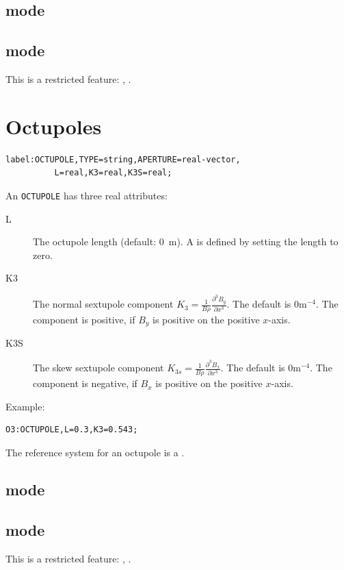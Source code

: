 \subsection{\opalt mode}

\subsection{\opalcycl mode}

This is a restricted feature: \noopalt, \noopalcycl .

\section{Octupoles}
\label{sec:octupole}
\begin{verbatim}
label:OCTUPOLE,TYPE=string,APERTURE=real-vector,
          L=real,K3=real,K3S=real;
\end{verbatim}
An \texttt{OCTUPOLE} has three real attributes:
\begin{description}
\item[L]
  The octupole length (default: 0~m).
  A  is defined by setting the length to zero.
\item[K3]
  The normal sextupole component
  $K_3=\frac{1}{B \rho}\frac{\partial^3 B_y}{\partial x^3}$.
  The default is $0 \mathrm{m}^{-4}$.
  The component is positive, if $B_y$ is positive on the positive $x$-axis.
\item[K3S]
  The skew sextupole component
  $K_{3s}=\frac{1}{B \rho}\frac{\partial^3 B_x}{\partial x^3}$.
  The default is $0 \mathrm{m}^{-4}$.
  The component is negative, if $B_x$ is positive on the positive $x$-axis.
\end{description}
\noindent Example:
\begin{verbatim}
O3:OCTUPOLE,L=0.3,K3=0.543;
\end{verbatim}
The reference system for an octupole is a 
.
\subsection{\opalt mode}

\subsection{\opalcycl mode}

This is a restricted feature: \noopalt, \noopalcycl .

